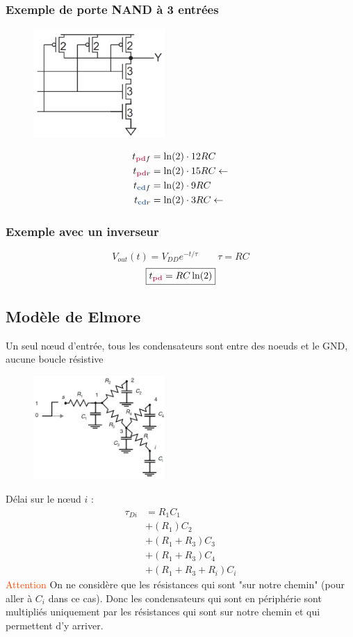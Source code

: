 \documentclass[resume]{subfiles}
\begin{document}
\begin{multicols}{3}
\subsubsection{Exemple de porte NAND à 3 entrées}
\begin{figure}[H]
\centering
\includegraphics[width=5cm]{img_42.png}
\end{figure}
\begin{align*}
t_{\pdelay f}&=\ln(2)\cdot 12RC\\
t_{\pdelay r}&=\ln(2)\cdot 15RC\leftarrow\\
t_{\cdelay f}&=\ln(2)\cdot 9RC\\
t_{\cdelay r}&=\ln(2)\cdot 3RC\leftarrow
\end{align*}

\subsubsection{Exemple avec un inverseur}
$$V_{out}(t)=V_{DD}e^{-t/\tau}\qquad \tau=RC$$
$$\boxed{t_{\pdelay}=RC\ln(2)}$$
\subsection{Modèle de Elmore}
Un seul nœud d'entrée, tous les condensateurs sont entre des noeuds et le GND, aucune boucle résistive
\begin{figure}[H]
\centering
\includegraphics[width=5.00cm]{img_43.png}
\end{figure}
Délai sur le nœud $i$ :
\begin{align*}
\tau_{Di}&=R_1C_1\\&+(R_1)C_2\\&+(R_1+R_3)C_3\\&+(R_1+R_3)C_4\\&+(R_1+R_3+R_i)C_i
\end{align*}
\textcolor{OrangeRed}{Attention} On ne considère que les résistances qui sont "sur notre chemin" (pour aller à $C_i$ dans ce cas). Donc les condensateurs qui sont en périphérie sont multipliés uniquement par les résistances qui sont sur notre chemin et qui permettent d'y arriver.

\end{multicols}
\end{document}
